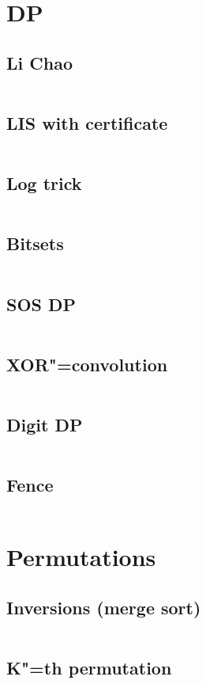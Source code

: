 ﻿\documentclass[10pt,twocolumn,oneside]{article}
\begin{document}
\section{DP}
\subsection{Li Chao}
\inputminted[breaklines]{cpp}{DP/Li Chao.cpp}
\subsection{LIS with certificate}
\inputminted[breaklines]{cpp}{DP/lis with certificate.cpp}
\subsection{Log trick}
\inputminted[breaklines]{cpp}{DP/log-trick.cpp}
\subsection{Bitsets}
\inputminted[breaklines]{cpp}{DP/bitset optimization.cpp}
\subsection{SOS DP}
\inputminted[breaklines]{cpp}{DP/sos-dp.cpp}
\subsection{XOR"=convolution}
\inputminted[breaklines]{cpp}{DP/hadamard.cpp}
\subsection{Digit DP}
\inputminted[breaklines]{cpp}{DP/digit dp.cpp}
\subsection{Fence}
\inputminted[breaklines]{cpp}{DP/fence.cpp}

\section{Permutations}
\subsection{Inversions (merge sort)}
\inputminted[breaklines]{cpp}{Permutations/inversions.cpp}
\subsection{K"=th permutation}
\inputminted[breaklines]{cpp}{Permutations/k-th permutation.cpp}
\end{document}
